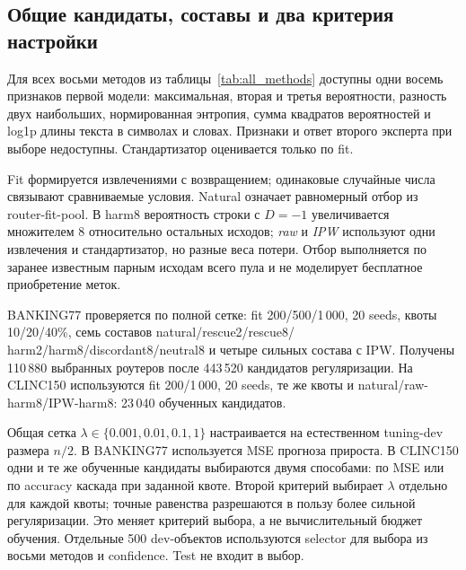 \subsection{Общие кандидаты, составы и два критерия настройки}
Для всех восьми методов из таблицы~\ref{tab:all_methods} доступны
одни восемь признаков первой модели: максимальная, вторая и третья
вероятности, разность двух наибольших, нормированная энтропия,
сумма квадратов вероятностей и log1p длины текста в символах и словах.
Признаки и ответ второго эксперта при выборе недоступны.
Стандартизатор оценивается только по fit.

Fit формируется извлечениями с возвращением; одинаковые случайные
числа связывают сравниваемые условия. Natural означает равномерный
отбор из router-fit-pool. В harm8 вероятность строки с $D=-1$
увеличивается множителем 8 относительно остальных исходов;
\emph{raw} и \emph{IPW} используют одни извлечения и стандартизатор,
но разные веса потери. Отбор выполняется по заранее известным
парным исходам всего пула и не моделирует бесплатное приобретение меток.

BANKING77 проверяется по полной сетке: fit 200/500/1\,000,
20 seeds, квоты 10/20/40\%, семь составов natural/rescue2/rescue8/
harm2/harm8/discordant8/neutral8 и четыре сильных состава с IPW.
Получены 110\,880 выбранных роутеров после 443\,520 кандидатов
регуляризации. На CLINC150 используются fit 200/1\,000, 20 seeds,
те же квоты и natural/raw-harm8/IPW-harm8: 23\,040 обученных кандидатов.

Общая сетка $\lambda\in\{0.001,0.01,0.1,1\}$ настраивается на
естественном tuning-dev размера $n/2$. В BANKING77 используется MSE
прогноза прироста. В CLINC150 одни и те же обученные кандидаты
выбираются двумя способами: по MSE или по accuracy каскада
при заданной квоте. Второй критерий выбирает $\lambda$ отдельно
для каждой квоты; точные равенства разрешаются в пользу более сильной
регуляризации. Это меняет критерий выбора, а не вычислительный
бюджет обучения. Отдельные 500 dev-объектов используются selector
для выбора из восьми методов и confidence. Test не входит в выбор.

